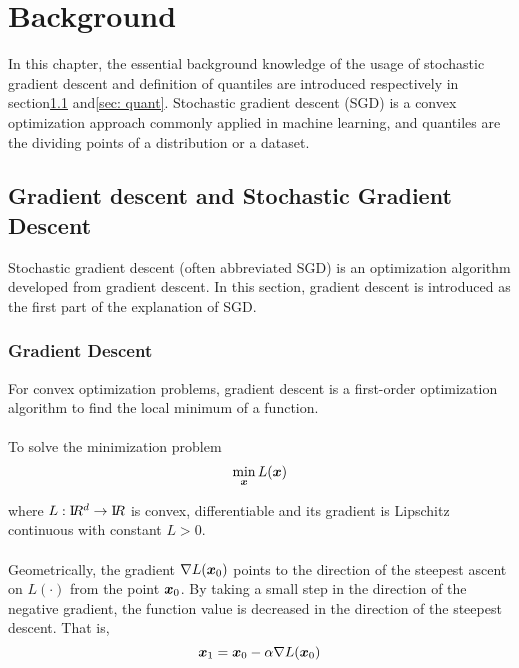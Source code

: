 
\chapter{Background}
\label{ch: background}
% 
In this chapter, the essential background knowledge of the usage of stochastic gradient descent and definition of quantiles are introduced respectively in section\ref{sec: sgd} and\ref{sec: quant}. Stochastic gradient descent (SGD) is a convex optimization approach commonly applied in machine learning, and quantiles are the dividing points of a distribution or a dataset.

\section{Gradient descent and Stochastic Gradient Descent}
\label{sec: sgd}
    Stochastic gradient descent (often abbreviated SGD) is an optimization algorithm developed from gradient descent. 
    In this section, gradient descent is introduced as the first part of the explanation of SGD.

    \subsection{Gradient Descent}
        For convex optimization problems, gradient descent is a first-order optimization algorithm 
        to find the local minimum of a function.
        \\\\
        To solve the minimization problem 
        \begin{equation}
            \min_{\bm{x}} L(\bm{x}) 
        \end{equation} 
        
        where $L : \mathrm I\!R^d \to \mathrm I\!R$ is convex, differentiable and its gradient is Lipschitz continuous with constant
        $L > 0$.
        \\\\
        Geometrically, the gradient $\nabla L(\bm{x}_0)$ points to the direction of the steepest ascent on $L(\cdot)$ 
        from the point $\bm{x}_0$. 
        By taking a small step in the direction of the negative gradient, the function value is decreased in the 
        direction of the steepest descent. That is,
        \begin{equation}
            \bm{x}_1  = \bm{x}_0 - \alpha \nabla L(\bm{x}_0)
        \end{equation}
    
